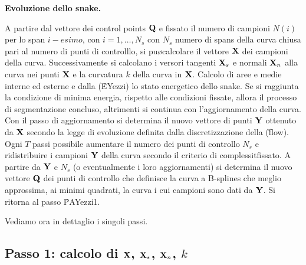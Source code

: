 \balg
{\bf Evoluzione dello snake.}\par
\ben
\im {} A partire dal vettore dei control points ${\bf Q}$ e fissato il numero di campioni $N(i)$
    per lo span $i-esimo$, con $i=1,\dots,N_s$ con $N_s$ numero di spans della curva chiusa
    pari al numero di punti di controlllo, si pu\o calcolare il vettore ${\bf X}$ dei 
    campioni della curva. 
    Successivamente si calcolano i versori tangenti ${\bf X}_s$ e normali ${\bf X}_n$ alla
    curva nei punti ${\bf X}$ e la curvatura $k$ della curva in ${\bf X}$.
\im Calcolo di aree e medie interne ed esterne e dalla (\r{EYezzi}) lo stato energetico
    dello snake.
\im Se si \e raggiunta la condizione di minima energia, rispetto alle condizioni fissate,
    allora il processo di segmentazione \e concluso, altrimenti si continua con
    l'aggiornamento della curva.
\im Con il passo di aggiornamento si determina il nuovo vettore di punti ${\bf Y}$
    ottenuto da ${\bf X}$ secondo la legge di evoluzione definita dalla discretizzazione della
    (\r{flow}).
\im Ogni $T$ passi \e possibile aumentare il numero dei punti di controllo $N_s$ e 
    ridistribuire i campioni ${\bf Y}$ della curva secondo il criterio di complessit\a fissato. 
\im A partire da ${\bf Y}$ e $N_s$ (o eventualmente i loro aggiornamenti) si determina il nuovo
    vettore ${\bf Q}$ dei punti di controllo che definisce la curva a B-splines che meglio
    approssima, ai minimi quadrati, la curva i cui campioni sono dati da ${\bf Y}$.
\im Si ritorna al passo \r{PAYezzi1}.
\een
\ealg

Vediamo ora in dettaglio i singoli passi.

\subsection{Passo 1: calcolo di ${\bf X}$, ${\bf X}_s$, ${\bf X}_n$, $k$}

